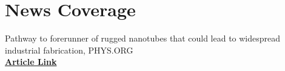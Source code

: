\documentclass[]{deedy-resume-openfont}
\begin{document}
\begin{minipage}[t]{0.55\textwidth}
\sectionsep

\section{News Coverage}
\textbullet{} Pathway to forerunner of rugged nanotubes that could lead to widespread industrial fabrication, PHYS.ORG \\

\href{https://phys.org/news/2021-09-pathway-forerunner-rugged-nanotubes-widespread.html}{\textbf{Article Link}}




% 
% 

\end{minipage} 
\end{document}
